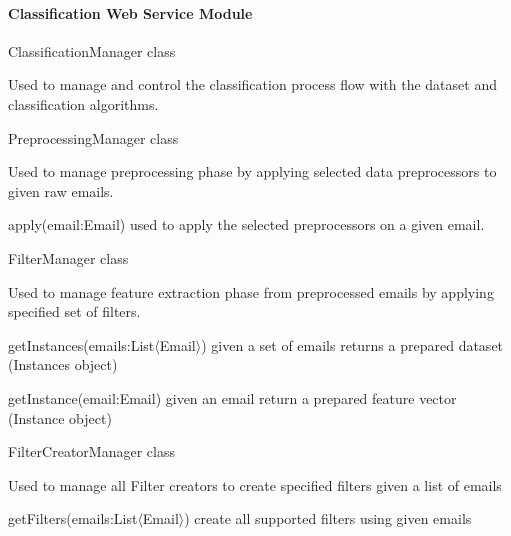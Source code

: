 \paragraph{Classification Web Service Module}

\begin{my_itemize}
  \item ClassificationManager class
  \begin{my_desc}
    \item[Purpose] Used to manage and control the classification process flow
      with the dataset and classification algorithms.
  \end{my_desc}
  \item PreprocessingManager class
  \begin{my_desc}
    \item[Purpose] Used to manage preprocessing phase by applying selected data preprocessors
      to given raw emails.
    \item[Functions] \hfill
    \begin{my_itemize}
      \item apply(email:Email) used to apply the selected preprocessors on a given email.
    \end{my_itemize}
  \end{my_desc}

  \item FilterManager class
  \begin{my_desc}
    \item[Purpose] Used to manage feature extraction phase from preprocessed emails by applying
      specified set of filters.
    \item[Functions] \hfill
    \begin{my_itemize}
      \item getInstances(emails:List$\langle$Email$\rangle$) given a set of emails returns a prepared dataset (Instances object)
      \item getInstance(email:Email) given an email return a prepared feature vector (Instance object)
    \end{my_itemize}

  \end{my_desc}

  \item FilterCreatorManager class
  \begin{my_desc}
    \item[Purpose] Used to manage all Filter creators to create specified filters given a list of emails
    \item[Functions] \hfill
    \begin{my_itemize}
      \item getFilters(emails:List$\langle$Email$\rangle$) create all supported filters using given emails
    \end{my_itemize}


\end{my_desc}
\end{my_itemize}
